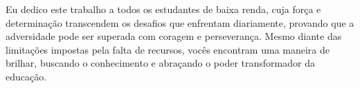 \newpage
    \begin{dedicatoria}
       \vspace*{\fill}
       \centering
       \hspace{.9\textwidth}
            \begin{minipage}{.6\textwidth}
            \setlength{\parskip}{0.5cm}	
            \fonteDedicatoria 
            \begin{itshape}
            	Eu dedico este trabalho a todos os estudantes de baixa renda, cuja força e determinação transcendem os desafios que enfrentam diariamente, provando que a adversidade pode ser superada com coragem e perseverança. Mesmo diante das limitações impostas pela falta de recursos, vocês encontram uma maneira de brilhar, buscando o conhecimento e abraçando o poder transformador da educação.        
            \end{itshape}
            \end{minipage}
        \vspace*{\fill}
    \end{dedicatoria}